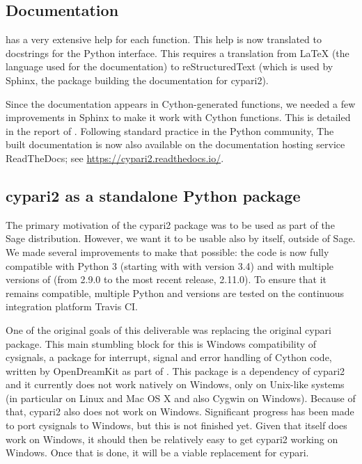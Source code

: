 \documentclass{deliverablereport}
\begin{document}
\subsection{Documentation}

\PariGP has a very extensive help for each function.
This help is now translated to docstrings for the Python interface.
This requires a translation from \LaTeX
(the language used for the \PariGP documentation)
to reStructuredText (which is used by Sphinx,
the package building the documentation for cypari2).

Since the documentation appears in Cython-generated functions,
we needed a few improvements in Sphinx to make it work
with Cython functions.
This is detailed in the report of .
Following standard practice in the Python community,
The built documentation is now also available on the
documentation hosting service ReadTheDocs;
see \url{https://cypari2.readthedocs.io/}.

\subsection{cypari2 as a standalone Python package}

The primary motivation of the cypari2 package
was to be used as part of the Sage distribution.
However, we want it to be usable also by itself, outside of Sage.
We made several improvements to make that possible:
the code is now fully compatible with Python 3 (starting with with version 3.4)
and with multiple versions of \PariGP (from 2.9.0 to the most recent release, 2.11.0).
To ensure that it remains compatible, multiple Python and \PariGP
versions are tested on the continuous integration platform Travis CI.

One of the original goals of this deliverable was replacing the original
cypari package.
This main stumbling block for this is Windows compatibility of cysignals,
a package for interrupt, signal and error handling
of Cython code, written by OpenDreamKit as part of .
This package is a dependency of cypari2 and it
currently does not work natively on Windows,
only on Unix-like systems
(in particular on Linux and Mac OS X and also Cygwin on Windows).
Because of that, cypari2 also does not work on Windows.
Significant progress has been made to port cysignals to Windows,
but this is not finished yet.
Given that \PariGP itself does work on Windows,
it should then be relatively easy to get cypari2 working on Windows.
Once that is done, it will be a viable replacement for cypari.

\end{document}
